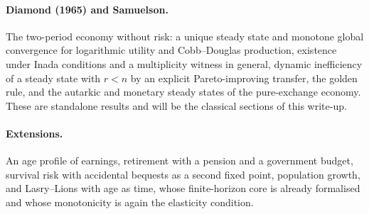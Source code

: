 \paragraph{Diamond (1965) and Samuelson.} The two-period economy without risk: a unique steady
state and monotone global convergence for logarithmic utility and Cobb--Douglas production,
existence under Inada conditions and a multiplicity witness in general, dynamic inefficiency of a
steady state with $r<n$ by an explicit Pareto-improving transfer, the golden rule, and the
autarkic and monetary steady states of the pure-exchange economy. These are standalone results
and will be the classical sections of this write-up.

\paragraph{Extensions.} An age profile of earnings, retirement with a pension and a government
budget, survival risk with accidental bequests as a second fixed point, population growth, and
Lasry--Lions with age as time, whose finite-horizon core is already formalised and whose
monotonicity is again the elasticity condition.
